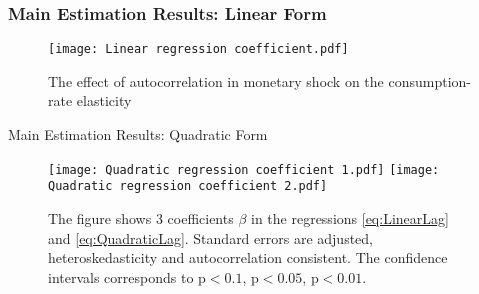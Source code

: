 \documentclass[11pt,pdf,aspectratio=129]{beamer}
\begin{document}
\begin{frame}\frametitle{Main Estimation Results: Linear Form}

    \begin{figure}[!htbp]\centering  
        \begin{minipage}{0.7\textwidth} \centering
            \caption{The effect of autocorrelation in monetary shock on the consumption-rate elasticity}
            \label{fig:MainRegressionCoefficients}
            \begin{minipage}{\textwidth}\centering
                \texttt{[image: Linear regression coefficient.pdf]}
            \end{minipage}
        \end{minipage}
    \end{figure}
\end{frame}


\begin{frame}{Main Estimation Results: Quadratic Form}
    \begin{figure}
        \begin{minipage}{\textwidth}
        \texttt{[image: Quadratic regression coefficient 1.pdf]}
        \texttt{[image: Quadratic regression coefficient 2.pdf]}
        {\begin{flushleft}\tiny 
            The figure shows 3 coefficients $\beta$ in the regressions \eqref{eq:LinearLag} and \eqref{eq:QuadraticLag}.
            Standard errors are adjusted, heteroskedasticity and autocorrelation consistent. 
            The confidence intervals corresponds to  p$<0.1$, p$<0.05$, p$<0.01$.
    \end{flushleft}}
\end{minipage}
    \end{figure}

\end{frame}
\end{document}
